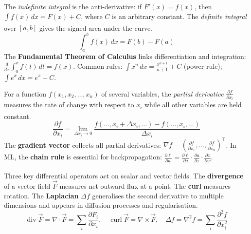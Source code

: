     \begin{tcbitemize}[ skin=sectionraster ]

        \tcbitem[title=Integration, raster multicolumn=6]
        The \emph{indefinite integral} is the anti-derivative: if $F'(x) = f(x)$, then $\int f(x)\,dx = F(x) + C$, where $C$ is an arbitrary constant. The \emph{definite integral} over $[a,b]$ gives the signed area under the curve\textsuperscript{\cite{yangMathematicsCivilEngineers2018}}.
        \tcblower
        \begin{equation}
            \int_a^b f(x)\,dx = F(b) - F(a)
        \end{equation}
        The \textbf{Fundamental Theorem of Calculus} links differentiation and integration: $\frac{d}{dx}\int_a^x f(t)\,dt = f(x)$. Common rules: $\int x^n\,dx = \frac{x^{n+1}}{n+1} + C$ (power rule); $\int e^x\,dx = e^x + C$.

        \tcbitem[title={Partial Differentiation}, raster multicolumn=6]
        For a function $f(x_1, x_2, \ldots, x_n)$ of several variables, the \emph{partial derivative} $\frac{\partial f}{\partial x_i}$ measures the rate of change with respect to $x_i$ while all other variables are held constant\textsuperscript{\cite{bronsteinTaschenbuchMathematik2001}}.
        \tcblower
        \begin{equation}
            \frac{\partial f}{\partial x_i} = \lim_{\Delta x_i \to 0} \frac{f(\ldots, x_i + \Delta x_i, \ldots) - f(\ldots, x_i, \ldots)}{\Delta x_i}
        \end{equation}
        The \textbf{gradient vector} collects all partial derivatives: $\nabla f = \left(\frac{\partial f}{\partial x_1}, \ldots, \frac{\partial f}{\partial x_n}\right)^\top$. In ML, the \textbf{chain rule} is essential for backpropagation: $\frac{\partial \ell}{\partial w} = \frac{\partial \ell}{\partial a}\cdot\frac{\partial a}{\partial z}\cdot\frac{\partial z}{\partial w}$.

        \tcbitem[title={Vector Analysis: div, curl, Laplacian}, raster multicolumn=6]
        Three key differential operators act on scalar and vector fields\textsuperscript{\cite{bronsteinTaschenbuchMathematik2001}}. The \textbf{divergence} of a vector field $\vec{F}$ measures net outward flux at a point. The \textbf{curl} measures rotation. The \textbf{Laplacian} $\Delta f$ generalises the second derivative to multiple dimensions and appears in diffusion processes and regularisation.
        \tcblower
        \begin{equation}
            \operatorname{div}\vec{F} = \nabla \cdot \vec{F} = \sum_i \frac{\partial F_i}{\partial x_i}, \quad
            \operatorname{curl}\vec{F} = \nabla \times \vec{F}, \quad
            \Delta f = \nabla^2 f = \sum_i \frac{\partial^2 f}{\partial x_i^2}
        \end{equation}

    \end{tcbitemize}

